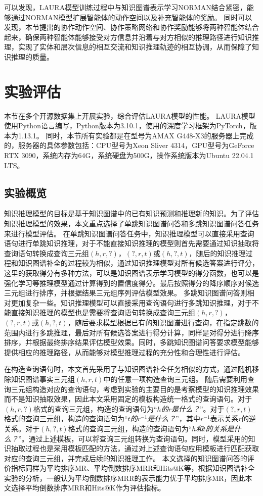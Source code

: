 \documentclass[algorithmlist, AutoFakeBold, AutoFakeSlant, figurelist, tablelist, nomlist, engineering]{seuthesix}
\begin{document}
可以发现，LAURA模型训练过程中与知识图谱表示学习NORMAN结合紧密，能够通过NORMAN模型扩展智能体的动作空间以及补充智能体的奖励。
同时可以发现，本节提出的协作动作空间、协作策略网络和协作奖励能够将两种智能体结合起来，确保两种智能体能够接受对方信息并沿着与对方相似的推理路径进行知识推理，实现了实体和层次信息的相互交流和知识推理轨迹的相互协调，从而保障了知识推理的质量。

\section{实验评估}
本节在多个开源数据集上开展实验，综合评估LAURA模型的性能。
LAURA模型使用Python语言编写，Python版本为3.10.1，使用的深度学习框架为PyTorch，版本为1.13.1。
同时，本节所有实验都是在型号为AMAX G448-X3的服务器上完成的，服务器的具体参数包括：CPU型号为Xeon Sliver 4314，GPU型号为GeForce RTX 3090，系统内存为64G，系统硬盘为500G，操作系统版本为Ubuntu 22.04.1 LTS。

\subsection{实验概览}
知识推理模型的目标是基于知识图谱中的已有知识预测和推理新的知识。为了评估知识推理模型的效果，本文重点选择了单跳知识图谱问答和多跳知识图谱问答任务来进行模型评估。
在单跳知识图谱问答任务中，知识推理模型可以直接采用查询语句进行单跳知识推理，对于不能直接知识推理的模型则首先需要通过知识抽取将查询语句转换成查询三元组$(h, r, ?)$，$(?, r, t)$或$(h, ?, t)$，随后的知识推理过程和知识图谱补全的过程较为相似，通过知识推理模型对所有候选答案进行评分，这里的获取得分有多种方法，可以是知识图谱表示学习模型的得分函数，也可以是强化学习等推理模型通过计算得到的置信度得分。最后按照得分的降序顺序对候选三元组进行排序，并根据结果三元组序列评估模型效果。
多跳知识图谱问答则相对更加复杂一些。知识推理模型可以直接采用查询语句进行多跳知识推理，对于不能直接知识推理的模型也是需要将查询语句转换成查询三元组$(h, r, ?)$，$(?, r, t)$或$(h, ?, t)$，随后要求模型根据已有的知识图谱进行查询，在指定跳数的范围内进行多跳推理，最后对所有候选答案进行得分计算，同样是对得分进行降序排序，并根据最终排序结果评估模型效果。同时，多跳知识图谱问答要求模型能够提供相应的推理路径，从而能够对模型推理过程的充分性和合理性进行评估。

在构造查询语句时，本文首先采用了与知识图谱补全任务相似的方式，通过随机移除知识图谱事实三元组$(h, r, t)$中的任意一项构造查询三元组。
随后需要利用查询三元组构造对应的查询语句，考虑到实验的主要目的是考察模型的知识推理效果而不是知识抽取效果，因此本文采用固定的模板构造统一格式的查询语句。对于$(h, r, ?)$格式的查询三元组，构造的查询语句为“\textit{$h$的$r$是什么？}”。对于$(?, r, t)$格式的查询三元组，构造的查询语句为“\textit{$t$的$r^{-1}$是什么？}”，其中$r^{-1}$表示关系$r$的逆关系。对于$(h, ?, t)$格式的查询三元组，构造的查询语句为“\textit{$h$和$t$的关系是什么？}”。通过上述模板，可以将查询三元组转换为查询语句。同时，模型采用的知识抽取过程也是采用模板匹配的方法，通过对上述查询语句应用模板进行匹配获取对应的查询三元组，并完成后续的知识推理工作。
本文选择的知识图谱问答的评价指标同样为平均排序MR、平均倒数排序MRR和Hits@K等，根据知识图谱补全实验的分析，一般认为平均倒数排序MRR的表示能力优于平均排序MR，因此本文选择平均倒数排序MRR和Hits@K作为评估指标。
\end{document}
